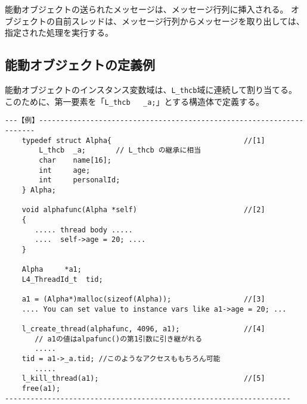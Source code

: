 \documentclass{jarticle}
\begin{document}
能動オブジェクトの送られたメッセージは、メッセージ行列に挿入される。
オブジェクトの自前スレッドは、メッセージ行列からメッセージを取り出しては、
指定された処理を実行する。

\subsection{能動オブジェクトの定義例}


能動オブジェクトのインスタンス変数域は、\verb|L_thcb|域に連続して割り当てる。
このために、第一要素を「\verb|L_thcb   _a;|」とする構造体で定義する。

\begin{verbatim}
---【例】---------------------------------------------------------------------
    typedef struct Alpha{                               //[1]
        L_thcb  _a;       // L_thcb の継承に相当
        char    name[16];
        int     age;
        int     personalId;
    } Alpha;

    void alphafunc(Alpha *self)                         //[2]
    {
       ..... thread body .....
       ....  self->age = 20; ....
    }

    Alpha     *a1;
    L4_ThreadId_t  tid;

    a1 = (Alpha*)malloc(sizeof(Alpha));                 //[3]
    .... You can set value to instance vars like a1->age = 20; ...

    l_create_thread(alphafunc, 4096, a1);               //[4]
       // a1の値はalpafunc()の第1引数に引き継がれる
       .....
    tid = a1->_a.tid; //このようなアクセスももちろん可能
       .....
    l_kill_thread(a1);                                  //[5]
    free(a1);
-------------------------------------------------------------------
\end{verbatim}
\end{document}
